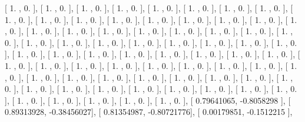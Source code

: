 \documentclass{article}
\begin{document}
       [ 1.        ,  0.        ],
       [ 1.        ,  0.        ],
       [ 1.        ,  0.        ],
       [ 1.        ,  0.        ],
       [ 1.        ,  0.        ],
       [ 1.        ,  0.        ],
       [ 1.        ,  0.        ],
       [ 1.        ,  0.        ],
       [ 1.        ,  0.        ],
       [ 1.        ,  0.        ],
       [ 1.        ,  0.        ],
       [ 1.        ,  0.        ],
       [ 1.        ,  0.        ],
       [ 1.        ,  0.        ],
       [ 1.        ,  0.        ],
       [ 1.        ,  0.        ],
       [ 1.        ,  0.        ],
       [ 1.        ,  0.        ],
       [ 1.        ,  0.        ],
       [ 1.        ,  0.        ],
       [ 1.        ,  0.        ],
       [ 1.        ,  0.        ],
       [ 1.        ,  0.        ],
       [ 1.        ,  0.        ],
       [ 1.        ,  0.        ],
       [ 1.        ,  0.        ],
       [ 1.        ,  0.        ],
       [ 1.        ,  0.        ],
       [ 1.        ,  0.        ],
       [ 1.        ,  0.        ],
       [ 1.        ,  0.        ],
       [ 1.        ,  0.        ],
       [ 1.        ,  0.        ],
       [ 1.        ,  0.        ],
       [ 1.        ,  0.        ],
       [ 1.        ,  0.        ],
       [ 1.        ,  0.        ],
       [ 1.        ,  0.        ],
       [ 1.        ,  0.        ],
       [ 1.        ,  0.        ],
       [ 1.        ,  0.        ],
       [ 1.        ,  0.        ],
       [ 1.        ,  0.        ],
       [ 1.        ,  0.        ],
       [ 1.        ,  0.        ],
       [ 1.        ,  0.        ],
       [ 1.        ,  0.        ],
       [ 1.        ,  0.        ],
       [ 1.        ,  0.        ],
       [ 1.        ,  0.        ],
       [ 1.        ,  0.        ],
       [ 1.        ,  0.        ],
       [ 1.        ,  0.        ],
       [ 1.        ,  0.        ],
       [ 1.        ,  0.        ],
       [ 1.        ,  0.        ],
       [ 1.        ,  0.        ],
       [ 1.        ,  0.        ],
       [ 1.        ,  0.        ],
       [ 1.        ,  0.        ],
       [ 1.        ,  0.        ],
       [ 1.        ,  0.        ],
       [ 1.        ,  0.        ],
       [ 1.        ,  0.        ],
       [ 1.        ,  0.        ],
       [ 1.        ,  0.        ],
       [ 1.        ,  0.        ],
       [ 1.        ,  0.        ],
       [ 1.        ,  0.        ],
       [ 1.        ,  0.        ],
       [ 1.        ,  0.        ],
       [ 0.79641065, -0.8058298 ],
       [ 0.89313928, -0.38456027],
       [ 0.81354987, -0.80721776],
       [ 0.00179851, -0.1512215 ],
\end{document}
